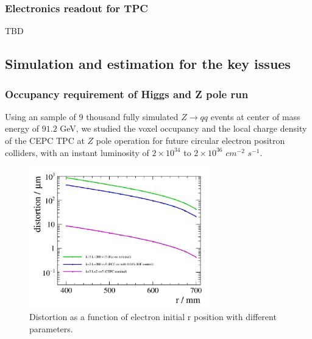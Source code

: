 \subsubsection{Electronics readout for TPC}

TBD

\subsection{Simulation and estimation for the key issues}
\subsubsection{Occupancy requirement of Higgs and Z pole run}

Using an sample of 9 thousand fully simulated $Z\to qq$ events at center of mass energy of $91. 2$ GeV, we studied the voxel occupancy and the local charge density of the CEPC TPC at $Z$ pole operation for future circular electron positron colliders, with an instant luminosity of $2\times 10^{34}$ to $2\times 10^{36}$ $cm^{-2}$ $s^{-1}$.

\begin{figure}[htbp]
\centering
\includegraphics[width=0.70\textwidth]{figures/TrackingSystem/distortion.jpg}
\caption{\label{fig:distortion} Distortion as a function of electron initial r position with different parameters.}
\end{figure}


